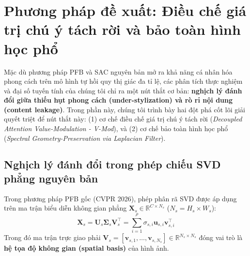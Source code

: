 \documentclass[10pt,twocolumn,letterpaper]{article}
\begin{document}
\section{Phương pháp đề xuất: Điều chế giá trị chú ý tách rời và bảo toàn hình học phổ}
\label{sec:proposal}

Mặc dù phương pháp PFB và SAC nguyên bản mở ra khả năng cá nhân hóa phong cách trên mô hình tự hồi quy thị giác đa tỉ lệ, các phân tích thực nghiệm và đại số tuyến tính của chúng tôi chỉ ra một nút thắt cơ bản: \textbf{nghịch lý đánh đổi giữa thiếu hụt phong cách (under-stylization) và rò rỉ nội dung (content leakage)}. Trong phần này, chúng tôi trình bày hai đột phá cốt lõi giải quyết triệt để nút thắt này: (1) cơ chế điều chế giá trị chú ý tách rời (\textit{Decoupled Attention Value-Modulation - V-Mod}), và (2) cơ chế bảo toàn hình học phổ (\textit{Spectral Geometry-Preservation via Laplacian Filter}).

\subsection{Nghịch lý đánh đổi trong phép chiếu SVD phẳng nguyên bản}
\label{subsec:svd_tradeoff}

Trong phương pháp PFB gốc (CVPR 2026), phép phân rã SVD được áp dụng trên ma trận biểu diễn không gian phẳng $\mathbf{X}_s \in \mathbb{R}^{C \times N_s}$ ($N_s = H_s \times W_s$):
\begin{equation}
\mathbf{X}_s = \mathbf{U}_s \boldsymbol{\Sigma}_s \mathbf{V}_s^\top = \sum_{i=1}^{\rho} \sigma_{s, i} \mathbf{u}_{s, i} \mathbf{v}_{s, i}^\top
\end{equation}
Trong đó ma trận trực giao phải $\mathbf{V}_s = [\mathbf{v}_{s, 1}, \dots, \mathbf{v}_{s, N_s}] \in \mathbb{R}^{N_s \times N_s}$ đóng vai trò là \textbf{hệ tọa độ không gian (spatial basis)} của hình ảnh.
\end{document}
